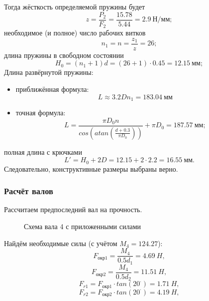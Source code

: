 \documentclass[14pt,a4paper,russian]{scrartcl}
\begin{document}
        Тогда жёсткость определяемой пружины будет
        \[ z = \frac{P_2}{F_2} = \frac{15.78}{5.44} = 2.9\ \text{Н/мм}; \]
        необходимое (и полное) число рабочих витков
        \[ n_1 = n = \frac{z_1}{z} = 26;\]
        длина пружины в свободном состоянии
        \[ H_0 = (n_1 + 1)d = (26 + 1)\cdot 0.45= 12.15\ \text{мм}; \]
        Длина развёрнутой пружины:
        \begin{itemize}
            \item приближённая формула:
                \[ L\approx 3.2Dn_1 = 183.04\ \text{мм} \]
            \item точная формула:
                \[ L = \frac{\pi D_0 n}{cos(atan(\frac{d+0.3}{\pi D_0 }))} + \pi D_0 = 187.57\ \text{мм};\]
        \end{itemize}
        
        полная длина с крючками
        \[ L' = H_0 + 2D = 12.15 + 2\cdot 2.2 = 16.55\ \text{мм}. \]
        Следовательно, конструктивные размеры выбраны верно.

    \subsubsection{Расчёт валов}
        Рассчитаем предпоследний вал на прочность. 
        \begin{figure}[h]
            \caption{Схема вала 4 с приложенными силами}
        \end{figure}
        Найдём необходимые силы (с учётом \( M_4 = 124.27 \)):
        \[ F_{\text{окр1}} = \frac{M_4}{0.5d_1} = 4.69\ H,\]
        \[ F_{\text{окр2}} = \frac{M_4}{0.5d_2} = 11.51\ H,\]
        \[ F_{r1} = F_{\text{окр1}}\cdot tan(20^\cdot) = 1.71\ H,\]
        \[ F_{r2} = F_{\text{окр2}}\cdot tan(20^\cdot) = 4.19\ H,\]
\end{document}
